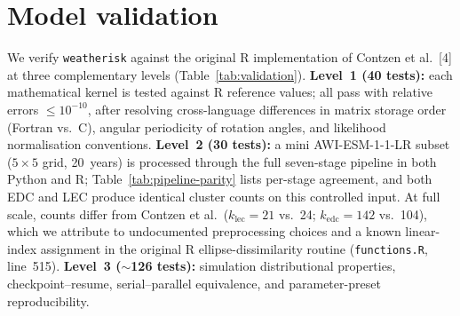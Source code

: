 \documentclass[preprint,12pt,a4paper]{elsarticle}
\newcommand{\rev}[1]{{#1}}
\begin{document}
\FloatBarrier


\rev{\section{Model validation}
\label{sec:validation}}

\rev{We verify \texttt{weatherisk} against the original R implementation
of Contzen et al.~[4] at three complementary levels
(Table~\ref{tab:validation}).
\textbf{Level~1 (40 tests):} each mathematical kernel is tested
against R reference values; all pass with relative errors
$\leq 10^{-10}$, after resolving cross-language differences in
matrix storage order (Fortran vs.\ C), angular periodicity of
rotation angles, and likelihood normalisation conventions.
\textbf{Level~2 (30 tests):} a mini AWI-ESM-1-1-LR subset
($5{\times}5$ grid, 20~years) is processed through the full
seven-stage pipeline in both Python and R;
Table~\ref{tab:pipeline-parity} lists per-stage agreement, and
both EDC and LEC produce identical cluster counts on this
controlled input.  At full scale, counts differ from Contzen
et al.\ ($k_{\text{lec}}=21$ vs.\ 24; $k_{\text{edc}}=142$
vs.\ 104), which we attribute to undocumented preprocessing
choices and a known linear-index assignment in the original R
ellipse-dissimilarity routine (\texttt{functions.R}, line~515).
\textbf{Level~3 ($\sim$126 tests):} simulation distributional
properties, checkpoint--resume, serial--parallel equivalence,
and parameter-preset reproducibility.

}
\end{document}
